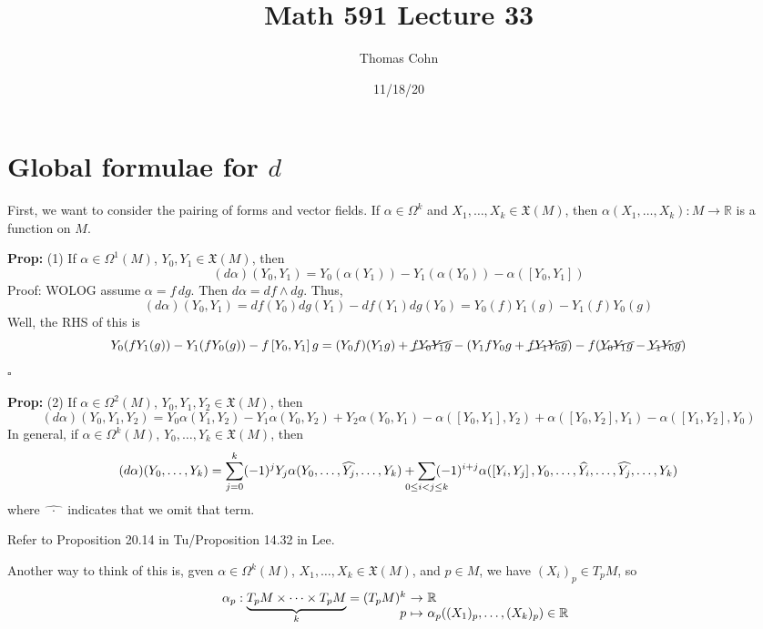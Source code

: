 \documentclass[10pt,letterpaper]{article}
\author{Thomas Cohn}
\title{Math 591 Lecture 33}
\date{11/18/20} %
\newcommand{\n}{\hfill\break}
\newcommand{\hangblock}[2]{\par\noindent\settowidth{\hangindent}{\textbf{#1: }}\textbf{#1: }\nolinebreak#2}
\newcommand{\prop}[1]{\hangblock{Prop}{#1}}
\newcommand{\proven}{\;$\square$\n}
\newcommand{\reals}{\mathbb{R}}
\newcommand{\R}{\reals}
\newcommand{\map}[4]{\!\!\!\begin{array}[t]{rcl}#1 & \!\!\!\!\to & \!\!\!\!#2\\ {}#3 & \!\!\!\!\mapsto & \!\!\!\!#4\end{array}}
\renewcommand{\brack}[1]{\left[#1\right]}
\begin{document}
\maketitle
\setlength\RaggedRightParindent{\parindent}
\RaggedRight

\section*{Global formulae for $d$}

\par\noindent
First, we want to consider the pairing of forms and vector fields. If $\alpha\in\Omega^{k}$ and $X_{1},\ldots,X_{k}\in\mathfrak{X}(M)$, then $\alpha(X_{1},\ldots,X_{k}):M\to\R$ is a function on $M$.\n

\prop{
	(1) If $\alpha\in\Omega^{1}(M)$, $Y_{0},Y_{1}\in\mathfrak{X}(M)$, then
	\[
		(d\alpha)(Y_{0},Y_{1})=Y_{0}(\alpha(Y_{1}))-Y_{1}(\alpha(Y_{0}))-\alpha(\brack{Y_{0},Y_{1}})
	\]
	Proof: WOLOG assume $\alpha=f\,dg$. Then $d\alpha=df\wedge{}dg$. Thus,
	\[
		(d\alpha)(Y_{0},Y_{1})=df(Y_{0})dg(Y_{1})-df(Y_{1})dg(Y_{0})=Y_{0}(f)Y_{1}(g)-Y_{1}(f)Y_{0}(g)
	\]
	Well, the RHS of this is
	\[
		Y_{0}(fY_{1}(g))-Y_{1}(fY_{0}(g))-f\brack{Y_{0},Y_{1}}g=(Y_{0}f)(Y_{1}g)+\cancel{fY_{0}Y_{1}g}-(Y_{1}fY_{0}g+\cancel{fY_{1}Y_{0}g})-f(\cancel{Y_{0}Y_{1}g}-\cancel{Y_{1}Y_{0}g})
	\]
	\proven
}

\prop{
	(2) If $\alpha\in\Omega^{2}(M)$, $Y_{0},Y_{1},Y_{2}\in\mathfrak{X}(M)$, then
	\[
		(d\alpha)(Y_{0},Y_{1},Y_{2})=Y_{0}\alpha(Y_{1},Y_{2})-Y_{1}\alpha(Y_{0},Y_{2})+Y_{2}\alpha(Y_{0},Y_{1})-\alpha(\brack{Y_{0},Y_{1}},Y_{2})+\alpha(\brack{Y_{0},Y_{2}},Y_{1})-\alpha(\brack{Y_{1},Y_{2}},Y_{0})
	\]
	In general, if $\alpha\in\Omega^{k}(M)$, $Y_{0},\ldots,Y_{k}\in\mathfrak{X}(M)$, then
	\[
		(d\alpha)(Y_{0},\ldots,Y_{k})=\sum_{j=0}^{k}(-1)^{j}Y_{j}\alpha(Y_{0},\ldots,\widehat{Y_{j}},\ldots,Y_{k})+\smashoperator{\sum_{0\le{}i<j\le{}k}}(-1)^{i+j}\alpha(\brack{Y_{i},Y_{j}},Y_{0},\ldots,\widehat{Y_{i}},\ldots,\widehat{Y_{j}},\ldots,Y_{k})
	\]
	where $\widehat{\;\,\cdot\;\,}$ indicates that we omit that term.\n
}

\par\noindent
Refer to Proposition 20.14 in Tu/Proposition 14.32 in Lee.\n

\par\noindent
Another way to think of this is, gven $\alpha\in\Omega^{k}(M)$, $X_{1},\ldots,X_{k}\in\mathfrak{X}(M)$, and $p\in{}M$, we have $(X_{i})_{p}\in{}T_{p}M$, so
\[
	\map{\alpha_{p}:\smash{\underbrace{T_{p}M\times\cdots\times{}T_{p}M}_{k}}=(T_{p}M)^{k}}{\R}{p}{\alpha_{p}((X_{1})_{p},\ldots,(X_{k})_{p})\in\R}
\]
\end{document}
